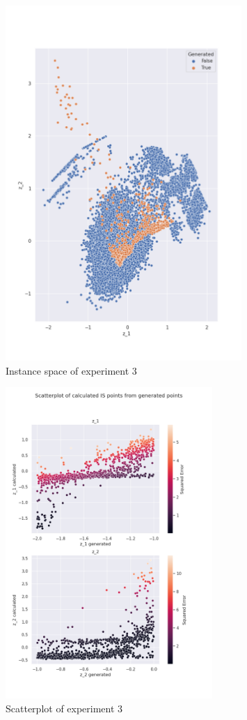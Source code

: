 \begin{figure}[H]
    \centering
    \includegraphics[width=0.8\textwidth]{Cap5/all_coords3.png}
    \caption{Instance space of experiment 3}
    \label{fig:is_exp3}
\end{figure}

\begin{figure}[H]
    \centering
    \includegraphics[width=0.7\textwidth]{Cap5/scatterplot3}
    \caption{Scatterplot of experiment 3}
    \label{fig:scatter_exp3}
\end{figure}

